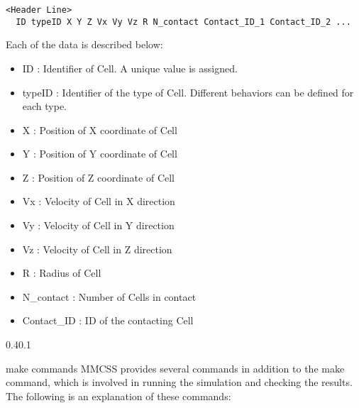 \documentclass[vipdfmx,a4paper,11pt]{jsarticle}
\makeatletter
\renewcommand{\subsection}{%
  \@startsection{subsection}{1}{\z@}%
  {0.4\Cvs}{0.1\Cvs}%
  {\normalfont\large\headfont\raggedright}}
\makeatother
\begin{document}
\begin{lstlisting}[caption=format of the result file]
  <Header Line>
  ID typeID X Y Z Vx Vy Vz R N_contact Contact_ID_1 Contact_ID_2 ...
\end{lstlisting}

Each of the data is described below:

\begin{itemize}
  \item ID : Identifier of Cell. A unique value is assigned.
  \item typeID : Identifier of the type of Cell. Different behaviors can be defined for each type.
  \item X : Position of X coordinate of Cell
  \item Y : Position of Y coordinate of Cell
  \item Z : Position of Z coordinate of Cell
  \item Vx : Velocity of Cell in X direction
  \item Vy : Velocity of Cell in Y direction
  \item Vz : Velocity of Cell in Z direction
  \item R : Radius of Cell
  \item N\_contact : Number of Cells in contact
  \item Contact\_ID : ID of the contacting Cell
\end{itemize}

\subsection{make commands}\label{make}
MMCSS provides several commands in addition to the make command, which is involved in running the simulation and checking the results.
The following is an explanation of these commands:
\end{document}
